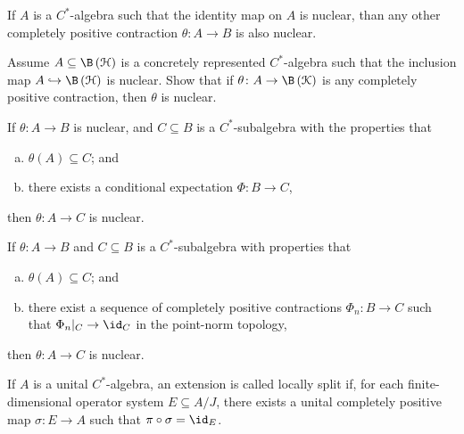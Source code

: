 \documentclass[10pt]{mypackage}
\begin{document}
\begin{exercise}[Exercise 2.1.5]
  If $A$ is a $C^{\ast}$-algebra such that the identity map on $A$ is nuclear, than any other completely positive contraction $\theta\colon A\rightarrow B$ is also nuclear.
\end{exercise}
\begin{exercise}[Exercise 2.1.6]
  Assume $A\subseteq \B\left( \mathcal{H} \right)$ is a concretely represented $C^{\ast}$-algebra such that the inclusion map $A\hookrightarrow \B\left( \mathcal{H} \right)$ is nuclear. Show that if $\theta\colon A\rightarrow \B\left( \mathcal{K} \right)$ is any completely positive contraction, then $\theta$ is nuclear.
\end{exercise}
\begin{exercise}[Exercise 2.1.7]
  If $\theta\colon A\rightarrow B$ is nuclear, and $C\subseteq B$ is a $C^{\ast}$-subalgebra with the properties that
  \begin{enumerate}[(a)]
    \item $\theta(A)\subseteq C$; and
    \item there exists a conditional expectation $\Phi\colon B\rightarrow C$,
  \end{enumerate}
  then $\theta\colon A\rightarrow C$ is nuclear.
\end{exercise}
\begin{exercise}[Exercise 2.1.8]
  If $\theta\colon A\rightarrow B$ and $C\subseteq B$ is a $C^{\ast}$-subalgebra with properties that 
  \begin{enumerate}[(a)]
    \item $\theta(A)\subseteq C$; and
    \item there exist a sequence of completely positive contractions $\Phi_n\colon B\rightarrow C$ such that $\Phi_n|_{C}\rightarrow \id_{C}$ in the point-norm topology,
  \end{enumerate}
  then $\theta\colon A\rightarrow C$ is nuclear.
\end{exercise}
\begin{definition}
  If $A$ is a unital $C^{\ast}$-algebra, an extension is called locally split if, for each finite-dimensional operator system $E\subseteq A/J$, there exists a unital completely positive map $\sigma\colon E\rightarrow A$ such that $\pi\circ \sigma = \id_{E}$.
  \begin{center}
  \end{center}
\end{definition}
\end{document}
